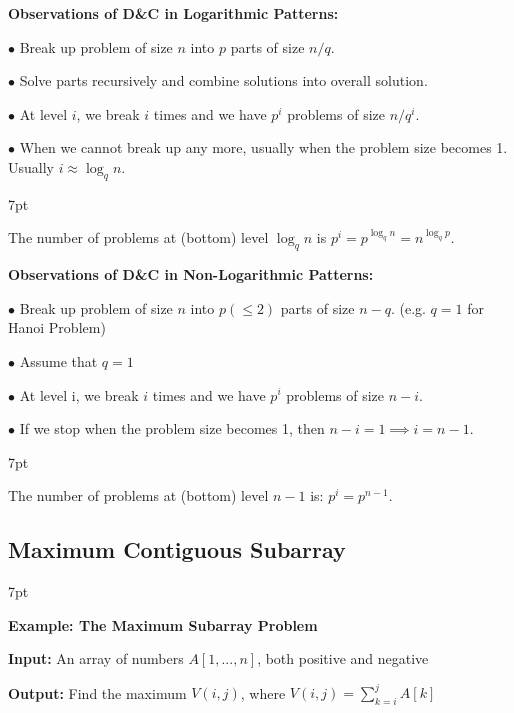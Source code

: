 \documentclass[10pt]{article}
\newenvironment{formal}[2]{%
	\def\FrameCommand{%
		\hspace{1pt}%
		{\color{#1}\vrule width 2pt}%
		{\color{#2}\vrule width 4pt}%
		\colorbox{#2}%
	}%
	\MakeFramed{\advance\hsize-\width\FrameRestore}%
	\noindent\hspace{-4.55pt}%
	\begin{adjustwidth}{}{7pt}%
		\vspace{2pt}\vspace{2pt}%
	}
	{%
		\vspace{2pt}\end{adjustwidth}\endMakeFramed%
}
\begin{document}
\textbf{Observations of D\&C in Logarithmic Patterns:}

$\bullet$ Break up problem of size $n$ into $p$ parts of size $n/q$.

$\bullet$ Solve parts recursively and combine solutions into overall solution.

$\bullet$ At level $i$, we break $i$ times and we have $p^i$ problems of size $n/q^i$.

$\bullet$ When we cannot break up any more, usually when the problem size 
becomes 1. Usually $i \approx \log_q n$.

\begin{formal}{DarkGreen}{greenshade}

The number of problems at (bottom) level $\log_q n$ is $p^i = p^{\log_q n} = n^{\log_q p}$.

\end{formal}

\vspace{1em}

\textbf{Observations of D\&C in Non-Logarithmic Patterns:}

$\bullet$ Break up problem of size $n$ into $p(\leq 2)$ parts of size $n-q$. (e.g. $q=1$ for Hanoi Problem)

$\bullet$ Assume that $q=1$

$\bullet$ At level i, we break $i$ times and we have $p^i$ problems of size $n-i$.

$\bullet$ If we stop when the problem size becomes 1, then $n-i=1 \implies i=n-1$.

\begin{formal}{DarkGreen}{greenshade}

The number of problems at (bottom) level $n-1$ is: $p^i = p^{n-1}$.

\end{formal}

\subsection{Maximum Contiguous Subarray}

\begin{formal}{Brown}{brownshade}
	
	\textbf{Example: The Maximum Subarray Problem}
	
	\textbf{Input:} An array of numbers $A[1,...,n]$, both positive and negative
	
	\textbf{Output:} Find the maximum $V(i, j)$, where $V(i, j) = \sum_{k=i}^j A[k]$
	
\end{formal}
\end{document}
